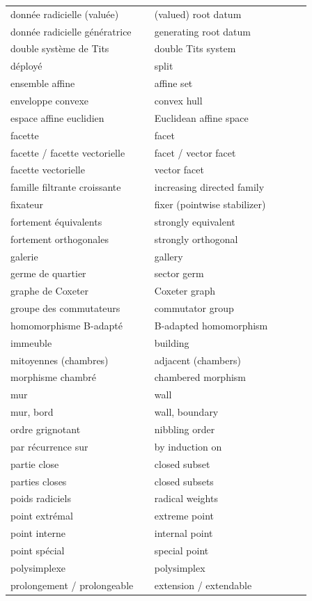 \documentclass[12pt,a4paper,oneside,english]{smfart}
\theoremstyle{definition}
\theoremstyle{bt}
\begin{document}
\begin{longtable}{@{}p{0.44\linewidth}p{0.48\linewidth}@{}}
donnée radicielle (valuée) & (valued) root datum\\
donnée radicielle génératrice & generating root datum\\
double syst\`eme de Tits & double Tits system\\
déployé & split\\
ensemble affine & affine set\\
enveloppe convexe & convex hull\\
espace affine euclidien & Euclidean affine space\\
facette & facet\\
facette / facette vectorielle & facet / vector facet\\
facette vectorielle & vector facet\\
famille filtrante croissante & increasing directed family\\
fixateur & fixer (pointwise stabilizer)\\
fortement \'equivalents & strongly equivalent\\
fortement orthogonales & strongly orthogonal\\
galerie & gallery\\
germe de quartier & sector germ\\
graphe de Coxeter & Coxeter graph\\
groupe des commutateurs & commutator group\\
homomorphisme B-adapt\'e & B-adapted homomorphism\\
immeuble & building\\
mitoyennes (chambres) & adjacent (chambers)\\
morphisme chambr\'e & chambered morphism\\
mur & wall\\
mur, bord & wall, boundary\\
ordre grignotant & nibbling order\\
par récurrence sur & by induction on\\
partie close & closed subset\\
parties closes & closed subsets\\
poids radiciels & radical weights\\
point extr\'emal & extreme point\\
point interne & internal point\\
point sp\'ecial & special point\\
polysimplexe & polysimplex\\
prolongement / prolongeable & extension / extendable\\

\end{longtable}
\end{document}
